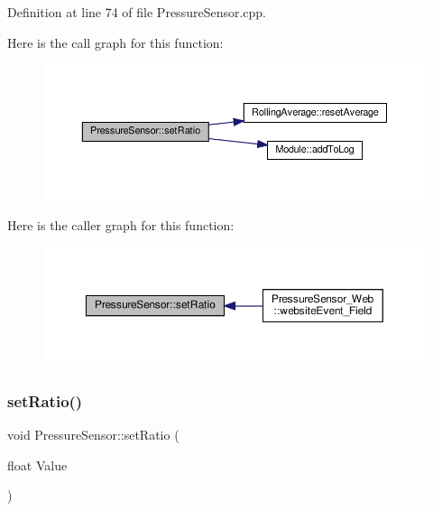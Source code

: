 Definition at line 74 of file Pressure\+Sensor.\+cpp.

Here is the call graph for this function\+:
\nopagebreak
\begin{figure}[H]
\begin{center}
\leavevmode
\includegraphics[width=350pt]{class_pressure_sensor_a5c46cbf770e053a41dad7ee63549ae7e_cgraph}
\end{center}
\end{figure}
Here is the caller graph for this function\+:
\nopagebreak
\begin{figure}[H]
\begin{center}
\leavevmode
\includegraphics[width=350pt]{class_pressure_sensor_a5c46cbf770e053a41dad7ee63549ae7e_icgraph}
\end{center}
\end{figure}
\mbox{\label{class_pressure_sensor_a5c46cbf770e053a41dad7ee63549ae7e}} 
\subsubsection{\texorpdfstring{set\+Ratio()}{setRatio()}\hspace{0.1cm}{\footnotesize\ttfamily [2/2]}}
{\footnotesize\ttfamily void Pressure\+Sensor\+::set\+Ratio (\begin{DoxyParamCaption}\item[{float}]{Value }\end{DoxyParamCaption})\hspace{0.3cm}{\ttfamily [protected]}}



